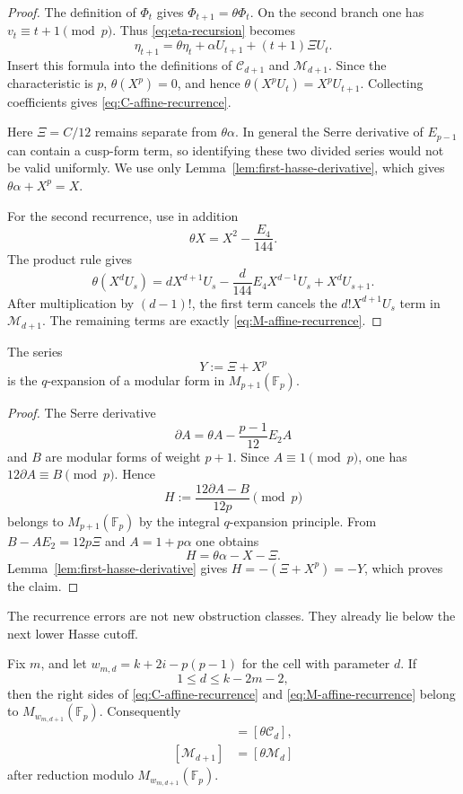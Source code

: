 \begin{proof}
The definition of $\Phi_t$ gives $\Phi_{t+1}=\theta\Phi_t$.  On the
second branch one has $v_t\equiv t+1\pmod p$.  Thus
\eqref{eq:eta-recursion} becomes
\[
 \eta_{t+1}=\theta\eta_t+\alpha U_{t+1}
 +(t+1)\Xi U_t.
\]
Insert this formula into the definitions of $\mathcal C_{d+1}$ and
$\mathcal M_{d+1}$.  Since the characteristic is $p$,
$\theta(X^p)=0$, and hence
$\theta(X^pU_t)=X^pU_{t+1}$.  Collecting coefficients gives
\eqref{eq:C-affine-recurrence}.

Here $\Xi=C/12$ remains separate from $\theta\alpha$.  In general the
Serre derivative of $E_{p-1}$ can contain a cusp-form term, so identifying
these two divided series would not be valid uniformly.  We use only
Lemma~\ref{lem:first-hasse-derivative}, which gives
$\theta\alpha+X^p=X$.

For the second recurrence, use in addition
\[
 \theta X=X^2-\frac{E_4}{144}.
\]
The product rule gives
\[
 \theta(X^dU_s)
 =dX^{d+1}U_s-\frac d{144}E_4X^{d-1}U_s+X^dU_{s+1}.
\]
After multiplication by $(d-1)!$, the first term cancels the
$d!X^{d+1}U_s$ term in $\mathcal M_{d+1}$.  The remaining terms are
exactly \eqref{eq:M-affine-recurrence}.
\end{proof}

\begin{lemma}
\label{lem:xi-plus-xp-modular}
The series
\[
 Y:=\Xi+X^p
\]
is the $q$-expansion of a modular form in $M_{p+1}(\mathbb F_p)$.
\end{lemma}

\begin{proof}
The Serre derivative
\[
 \partial A=\theta A-\frac{p-1}{12}E_2A
\]
and $B$ are modular forms of weight $p+1$.  Since $A\equiv1\pmod p$,
one has $12\partial A\equiv B\pmod p$.  Hence
\[
 H:=\frac{12\partial A-B}{12p}\pmod p
\]
 belongs to $M_{p+1}(\mathbb F_p)$ by the integral $q$-expansion
 principle.  From
$B-AE_2=12p\Xi$ and $A=1+p\alpha$ one obtains
\[
 H=\theta\alpha-X-\Xi.
\]
Lemma~\ref{lem:first-hasse-derivative} gives
$H=-(\Xi+X^p)=-Y$, which proves the claim.
\end{proof}

The recurrence errors are not new obstruction classes.  They already lie
below the next lower Hasse cutoff.

\begin{corollary}
\label{cor:factorial-recurrence-errors-low}
Fix $m$, and let $w_{m,d}=k+2i-p(p-1)$ for the cell with parameter $d$.
If
\[
 1\leq d\leq k-2m-2,
\]
then the right sides of \eqref{eq:C-affine-recurrence} and
\eqref{eq:M-affine-recurrence} belong to
$M_{w_{m,d+1}}(\mathbb F_p)$.  Consequently
\begin{align*}
 [\mathcal C_{d+1}]&=[\theta\mathcal C_d],\\
 [\mathcal M_{d+1}]&=[\theta\mathcal M_d]
\end{align*}
after reduction modulo $M_{w_{m,d+1}}(\mathbb F_p)$.
\end{corollary}

